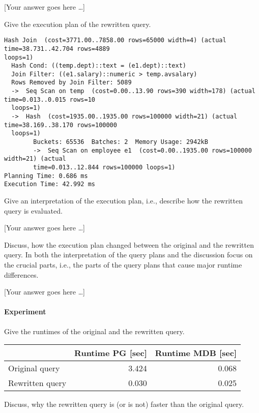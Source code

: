 \documentclass[11pt]{scrartcl}
\newcommand{\youranswerhere}{[Your answer goes here \ldots]}
\begin{document}
    \youranswerhere{}

    Give the execution plan of the rewritten query.

            {\small
    \parskip0pt\begin{verbatim}
Hash Join  (cost=3771.00..7858.00 rows=65000 width=4) (actual time=38.731..42.704 rows=4889 
loops=1)
  Hash Cond: ((temp.dept)::text = (e1.dept)::text)
  Join Filter: ((e1.salary)::numeric > temp.avsalary)
  Rows Removed by Join Filter: 5089
  ->  Seq Scan on temp  (cost=0.00..13.90 rows=390 width=178) (actual time=0.013..0.015 rows=10 
  loops=1)
  ->  Hash  (cost=1935.00..1935.00 rows=100000 width=21) (actual time=38.169..38.170 rows=100000 
  loops=1)
        Buckets: 65536  Batches: 2  Memory Usage: 2942kB
        ->  Seq Scan on employee e1  (cost=0.00..1935.00 rows=100000 width=21) (actual 
        time=0.013..12.844 rows=100000 loops=1)
Planning Time: 0.686 ms
Execution Time: 42.992 ms
    \end{verbatim}}

    Give an interpretation of the execution plan, i.e., describe how the rewritten query is evaluated.

    \youranswerhere{}

    Discuss, how the execution plan changed between the original and the rewritten query. In both the interpretation of the query plans and the discussion focus on the crucial parts, i.e., the parts of the query plans that cause major runtime differences.

    \youranswerhere{}

    \paragraph{Experiment}

    Give the runtimes of the original and the rewritten query.

    \begin{table}[H]
        \centering
        \begin{tabular}{l|r|r}
            & Runtime PG [sec] & Runtime MDB [sec] \tabularnewline
            \hline
            Original query & 3.424 & 0.068 \tabularnewline
            Rewritten query & 0.030 & 0.025 \tabularnewline
        \end{tabular}
    \end{table}

    Discuss, why the rewritten query is (or is not) faster than the original query.
\end{document}
